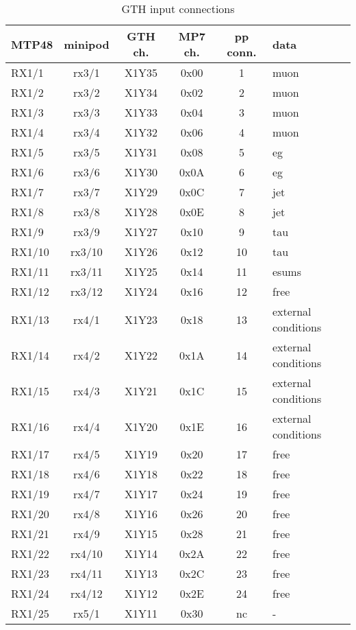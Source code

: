 \begin{longtable}{|l|c|c|c|c|l|}
\caption{GTH input connections}
    \label{tab:app:gth_i_conn}\\
\hline
\textbf{MTP48}& \textbf{minipod}& \textbf{GTH ch.}& \textbf{MP7 ch.} &\textbf{pp conn.}& \textbf{data}\\
\hline
\hline
\endhead
RX1/1  & rx3/1  & X1Y35 & 0x00 & 1  & muon\\\hline
RX1/2  & rx3/2  & X1Y34 & 0x02 & 2  & muon\\\hline
RX1/3  & rx3/3  & X1Y33 & 0x04 & 3  & muon\\\hline
RX1/4  & rx3/4  & X1Y32 & 0x06 & 4  & muon\\\hline
RX1/5  & rx3/5  & X1Y31 & 0x08 & 5  & eg\\\hline
RX1/6  & rx3/6  & X1Y30 & 0x0A & 6  & eg\\\hline
RX1/7  & rx3/7  & X1Y29 & 0x0C & 7  & jet\\\hline
RX1/8  & rx3/8  & X1Y28 & 0x0E & 8  & jet\\\hline
RX1/9  & rx3/9  & X1Y27 & 0x10 & 9  & tau\\\hline
RX1/10 & rx3/10 & X1Y26 & 0x12 & 10 & tau\\\hline
RX1/11 & rx3/11 & X1Y25 & 0x14 & 11 & esums\\\hline
RX1/12 & rx3/12 & X1Y24 & 0x16 & 12 & free\\\hline
RX1/13 & rx4/1  & X1Y23 & 0x18 & 13 & external conditions\\\hline
RX1/14 & rx4/2  & X1Y22 & 0x1A & 14 & external conditions\\\hline
RX1/15 & rx4/3  & X1Y21 & 0x1C & 15 & external conditions\\\hline
RX1/16 & rx4/4  & X1Y20 & 0x1E & 16 & external conditions\\\hline
RX1/17 & rx4/5  & X1Y19 & 0x20 & 17 & free\\\hline
RX1/18 & rx4/6  & X1Y18 & 0x22 & 18 & free\\\hline
RX1/19 & rx4/7  & X1Y17 & 0x24 & 19 & free\\\hline
RX1/20 & rx4/8  & X1Y16 & 0x26 & 20 & free\\\hline
RX1/21 & rx4/9  & X1Y15 & 0x28 & 21 & free\\\hline
RX1/22 & rx4/10 & X1Y14 & 0x2A & 22 & free\\\hline
RX1/23 & rx4/11 & X1Y13 & 0x2C & 23 & free\\\hline
RX1/24 & rx4/12 & X1Y12 & 0x2E & 24 & free\\\hline
RX1/25 & rx5/1  & X1Y11 & 0x30 & nc & -\\\hline

\end{longtable}
